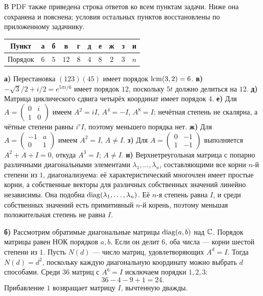 В PDF также приведена строка ответов ко всем пунктам задачи.
Ниже она сохранена и пояснена; условия остальных пунктов восстановлены
по приложенному задачнику.
\begin{center}
\begin{tabular}{c|ccccccccc}
Пункт & а & б & в & г & д & е & ж & з & и\\\hline
Порядок & $6$ & $5$ & $12$ & $8$ & $4$ & $8$ & $2$ & $3$ & $n$
\end{tabular}
\end{center}
\textbf{а)} Перестановка $(123)(45)$ имеет порядок $\operatorname{lcm}(3,2)=6$.
\textbf{в)} $-\sqrt3/2+i/2=e^{5\pi i/6}$ имеет порядок $12$,
поскольку $5t$ должно делиться на $12$.
\textbf{д)} Матрица циклического сдвига четырёх координат имеет порядок $4$.
\textbf{е)} Для
$A=\left(\begin{smallmatrix}0&i\\1&0\end{smallmatrix}\right)$
имеем $A^2=iI$, $A^4=-I$, $A^8=I$; нечётная степень не скалярна,
а чётные степени равны $i^rI$, поэтому меньшего порядка нет.
\textbf{ж)} Для
$A=\left(\begin{smallmatrix}-1&a\\0&1\end{smallmatrix}\right)$
имеем $A^2=I$, $A\ne I$.
\textbf{з)} Для
$A=\left(\begin{smallmatrix}0&-1\\1&-1\end{smallmatrix}\right)$
выполняется $A^2+A+I=0$, откуда $A^3=I$; $A\ne I$.
\textbf{и)} Верхнетреугольная матрица с попарно различными диагональными
элементами $\lambda_1,\dots,\lambda_n$, составляющими все корни
$n$-й степени из $1$, диагонализуема: её характеристический многочлен
имеет простые корни, а собственные векторы для различных собственных
значений линейно независимы. Она подобна $\operatorname{diag}(\lambda_1,\dots,\lambda_n)$.
Её $n$-я степень равна $I$, и среди собственных значений есть примитивный
$n$-й корень, поэтому меньшая положительная степень не равна $I$.

\textbf{б)} Рассмотрим обратимые диагональные матрицы
$\operatorname{diag}(a,b)$ над $\mathbb{C}$. Порядок матрицы равен НОК порядков
$a,b$. Если он делит $6$, оба числа --- корни шестой степени из $1$.
Пусть $N(d)$ --- число матриц, удовлетворяющих $A^d=I$.
Тогда $N(d)=d^2$, поскольку каждую диагональную координату
можно выбрать $d$ способами.
Среди $36$ матриц с $A^6=I$ исключаем порядки $1,2,3$:
\[36-4-9+1=24.\]
Прибавление $1$ возвращает матрицу $I$, вычтенную дважды.

